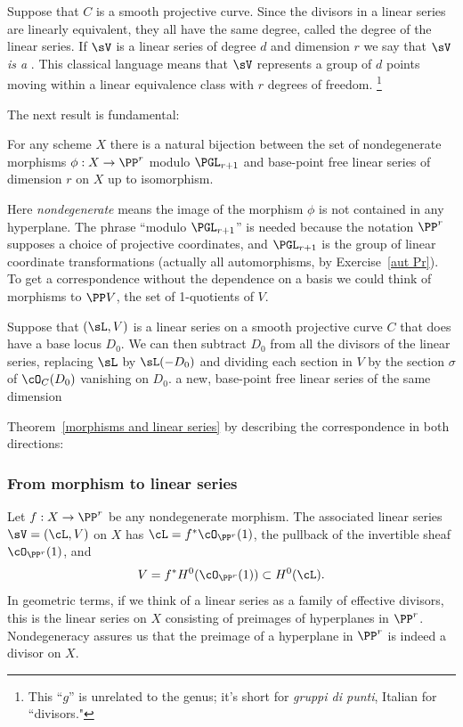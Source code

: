 Suppose that $C$ is a smooth projective curve. Since the divisors in a linear series are linearly equivalent, they all have the same 
degree, called the degree of the linear series. If $\sV$ is a linear
series of degree $d$ and dimension $r$ we say that \emph{$\sV$ is a}
.
%
This classical  language means that $\sV$ 
represents a group of $d$
points moving within a linear equivalence class with $r$ degrees
of freedom.%
\footnote{
This ``$g$'' is unrelated to the genus; 
it's short for \emph{gruppi di punti}, Italian for ``divisors."}

The next result is fundamental:

\begin{theorem}\label{morphisms and linear series}
For any scheme $X$ there is a natural bijection between the set of
nondegenerate morphisms $\phi : X \to \PP^r$ modulo $\PGL_{r+1}$ and
base-point free linear series of dimension $r$ on $X$ up to isomorphism. 
\end{theorem}

Here \emph{nondegenerate} means the image of the morphism $\phi$ is
not contained in any hyperplane. The phrase ``modulo $\PGL_{r+1}$'' is
needed because the notation $\PP^r$ supposes a choice of projective
coordinates, and 
$\PGL_{r+1}$ is the group of linear coordinate transformations (actually all automorphisms, by Exercise~\ref{aut Pr}).
To get a correspondence without the dependence on a basis we could think of morphisms to $\PP V$, the set of 1-quotients of $V$.

Suppose that $(\sL, V)$ is a linear series on a smooth projective curve $C$ that does have a base locus $D_0$. We can then subtract $D_0$ from all the divisors of the linear series, replacing $\sL$ by $\sL(-D_0)$ and dividing each section in $V$
by the section $\sigma$ of $\cO_C(D_0)$ vanishing on $D_0$.
a new, base-point free linear series of the same dimension 

Theorem~\ref{morphisms and linear series} 
by describing the correspondence in both directions:

\subsubsection*{From morphism to linear series}
Let 
$f : X \to \PP^r$ be any nondegenerate morphism. The associated linear series $\sV = (\cL, V)$ on $X$ has $\cL = f^*\cO_{\PP^r}(1)$, the pullback of the invertible sheaf $\cO_{\PP^r}(1)$, and 
$$
V = f^*H^0(\cO_{\PP^r}(1)) \subset H^0(\cL).
$$
In geometric terms, if we think of a linear series as a family of
effective divisors, this is the linear series on $X$ consisting of
preimages of hyperplanes in $\PP^r$. 
Nondegeneracy assures us that the preimage of 
a hyperplane in $\PP^r$ is indeed a divisor on $X$.

